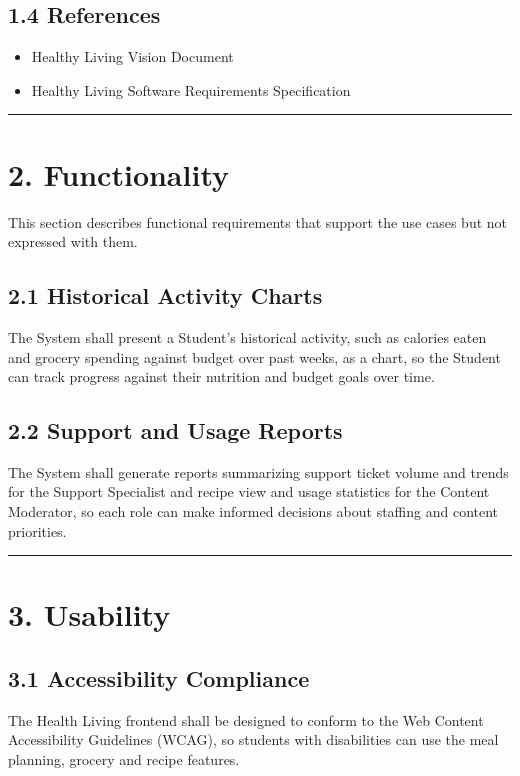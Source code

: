 \documentclass[10pt,letterpaper]{article}
\newcommand{\ucseparator}{\vspace{1em}\noindent\rule{\linewidth}{0.4pt}\vspace{1.5em}}
\begin{document}
\subsection*{1.4 References}
\begin{itemize}
    \item Healthy Living Vision Document
    \item Healthy Living Software Requirements Specification
\end{itemize}

\ucseparator

\section*{2. Functionality}

This section describes functional requirements that support the use cases but not expressed with them.

\subsection*{2.1 Historical Activity Charts}
The System shall present a Student's historical activity, such as calories eaten and grocery spending against budget over past weeks, as a chart, so the Student can track progress against their nutrition and budget goals over time.

\subsection*{2.2 Support and Usage Reports}
The System shall generate reports summarizing support ticket volume and trends for the Support Specialist and recipe view and usage statistics for the Content Moderator, so each role can make informed decisions about staffing and content priorities.

\ucseparator

\section*{3. Usability}

\subsection*{3.1 Accessibility Compliance}
The Health Living frontend shall be designed to conform to the Web Content Accessibility Guidelines (WCAG), so students with disabilities can use the meal planning, grocery and recipe features.
\end{document}
